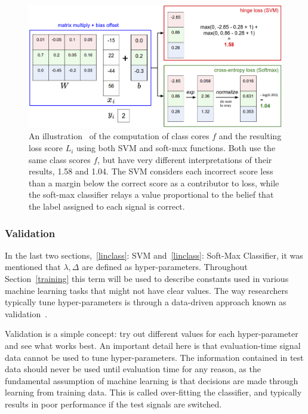 \begin{figure}[ht!]
	\centering	\includegraphics[width=1\textwidth,keepaspectratio]{figs/svmvssoftmax.png}
    \caption{An illustration~\cite{cs231} of the computation of class cores $f$ and the resulting loss score $L_i$ using both SVM and soft-max functions. Both use the same class scores $f$, but have very different interpretations of their results, 1.58 and 1.04. The SVM considers each incorrect score less than a margin below the correct score as a contributor to loss, while the soft-max classifier relays a value proportional to the belief that the label assigned to each signal is correct.}
\label{fig:svmvssoftmax}      
\end{figure}

\subsubsection{Validation}
\label{valid}
In the last two sections,~\ref{linclass}: SVM and~\ref{linclass}: Soft-Max Classifier, it was mentioned that $\lambda, \Delta$ are defined as hyper-parameters. Throughout Section~\ref{training} this term will be used to describe constants used in various machine learning tasks that might not have clear values. The way researchers typically tune hyper-parameters is through a data-driven approach known as validation~\cite{cs231}.

Validation is a simple concept: try out different values for each hyper-parameter and see what works best. An important detail here is that evaluation-time signal data cannot be used to tune hyper-parameters. The information contained in test data should never be used until evaluation time for any reason, as the fundamental assumption of machine learning is that decisions are made through learning from training data. This is called over-fitting the classifier, and typically results in poor performance if the test signals are switched.

